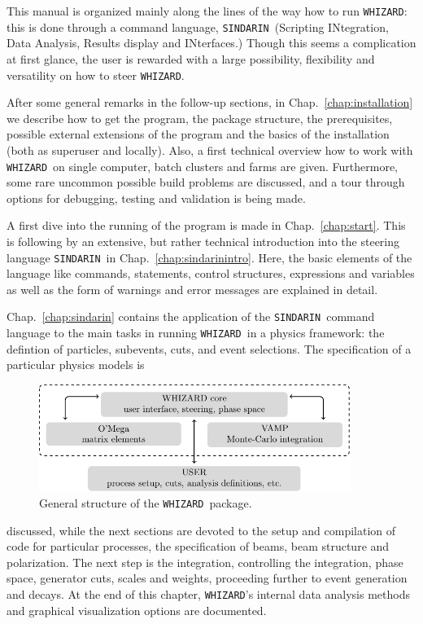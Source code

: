 \documentclass[12pt]{book}
\newcommand{\ttt}[1]{\texttt{#1}}
\newcommand{\whizard}{\ttt{WHIZARD}}
\newcommand{\sindarin}{\ttt{SINDARIN}}
\begin{document}
This manual is organized mainly along the lines of the way how to run
\whizard: this is done through a command language, \sindarin\ (Scripting
INtegration, Data Analysis, Results display and INterfaces.) Though
this seems a complication at first glance, the user is rewarded with a
large possibility, flexibility and versatility on how to steer
\whizard.

After some general remarks in the follow-up sections, in
Chap.~\ref{chap:installation} we describe how to get the program, the
package structure, the prerequisites, possible external extensions of
the program and the basics of the installation (both as superuser and
locally). Also, a first technical overview how to work with \whizard\
on single computer, batch clusters and farms are given. Furthermore,
some rare uncommon possible build problems are discussed, and a tour
through options for debugging, testing and validation is being made.

A first dive into the running of the program is made in
Chap.~\ref{chap:start}. This is following by an extensive, but rather
technical introduction into the steering language \sindarin\ in
Chap.~\ref{chap:sindarinintro}. Here, the basic elements of the
language like commands, statements, control structures, expressions
and variables as well as the form of warnings and error messages are
explained in detail.

Chap.~\ref{chap:sindarin} contains the application of the \sindarin\
command language to the main tasks in running \whizard\ in a physics
framework: the defintion of particles, subevents, cuts, and event
selections. The specification of a particular physics models is
\begin{figure}[t]
  \centering
  \includegraphics[width=0.9\textwidth]{whizstruct}
  \caption{General structure of the \whizard\ package.}
\end{figure}
discussed, while the next sections are devoted to the setup and
compilation of code for particular processes, the specification of
beams, beam structure and polarization. The next step is the
integration, controlling the integration, phase space, generator cuts,
scales and weights, proceeding further to event generation and
decays. At the end of this chapter, \whizard's internal data analysis
methods and graphical visualization options are documented.
\end{document}
